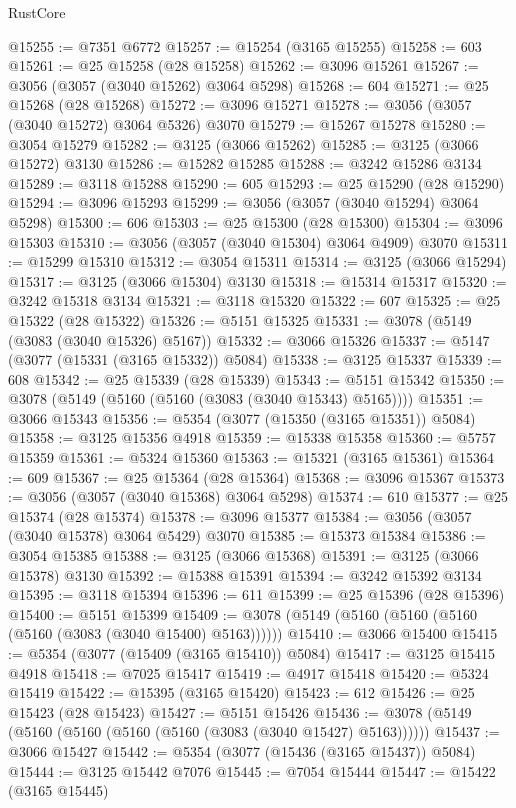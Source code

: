 \begin{lexlean}{RustCore}
\begin{coremodule}
@15255 := @7351 @6772
@15257 := @15254 (@3165 @15255)
@15258 := 603
@15261 := @25 @15258 (@28 @15258)
@15262 := @3096 @15261
@15267 := @3056 (@3057 (@3040 @15262) @3064 @5298)
@15268 := 604
@15271 := @25 @15268 (@28 @15268)
@15272 := @3096 @15271
@15278 := @3056 (@3057 (@3040 @15272) @3064 @5326) @3070
@15279 := @15267 @15278
@15280 := @3054 @15279
@15282 := @3125 (@3066 @15262)
@15285 := @3125 (@3066 @15272) @3130
@15286 := @15282 @15285
@15288 := @3242 @15286 @3134
@15289 := @3118 @15288
@15290 := 605
@15293 := @25 @15290 (@28 @15290)
@15294 := @3096 @15293
@15299 := @3056 (@3057 (@3040 @15294) @3064 @5298)
@15300 := 606
@15303 := @25 @15300 (@28 @15300)
@15304 := @3096 @15303
@15310 := @3056 (@3057 (@3040 @15304) @3064 @4909) @3070
@15311 := @15299 @15310
@15312 := @3054 @15311
@15314 := @3125 (@3066 @15294)
@15317 := @3125 (@3066 @15304) @3130
@15318 := @15314 @15317
@15320 := @3242 @15318 @3134
@15321 := @3118 @15320
@15322 := 607
@15325 := @25 @15322 (@28 @15322)
@15326 := @5151 @15325
@15331 := @3078 (@5149 (@3083 (@3040 @15326) @5167))
@15332 := @3066 @15326
@15337 := @5147 (@3077 (@15331 (@3165 @15332)) @5084)
@15338 := @3125 @15337
@15339 := 608
@15342 := @25 @15339 (@28 @15339)
@15343 := @5151 @15342
@15350 := @3078 (@5149 (@5160 (@5160 (@3083 (@3040 @15343) @5165))))
@15351 := @3066 @15343
@15356 := @5354 (@3077 (@15350 (@3165 @15351)) @5084)
@15358 := @3125 @15356 @4918
@15359 := @15338 @15358
@15360 := @5757 @15359
@15361 := @5324 @15360
@15363 := @15321 (@3165 @15361)
@15364 := 609
@15367 := @25 @15364 (@28 @15364)
@15368 := @3096 @15367
@15373 := @3056 (@3057 (@3040 @15368) @3064 @5298)
@15374 := 610
@15377 := @25 @15374 (@28 @15374)
@15378 := @3096 @15377
@15384 := @3056 (@3057 (@3040 @15378) @3064 @5429) @3070
@15385 := @15373 @15384
@15386 := @3054 @15385
@15388 := @3125 (@3066 @15368)
@15391 := @3125 (@3066 @15378) @3130
@15392 := @15388 @15391
@15394 := @3242 @15392 @3134
@15395 := @3118 @15394
@15396 := 611
@15399 := @25 @15396 (@28 @15396)
@15400 := @5151 @15399
@15409 := @3078 (@5149 (@5160 (@5160 (@5160 (@5160 (@3083 (@3040 @15400) @5163))))))
@15410 := @3066 @15400
@15415 := @5354 (@3077 (@15409 (@3165 @15410)) @5084)
@15417 := @3125 @15415 @4918
@15418 := @7025 @15417
@15419 := @4917 @15418
@15420 := @5324 @15419
@15422 := @15395 (@3165 @15420)
@15423 := 612
@15426 := @25 @15423 (@28 @15423)
@15427 := @5151 @15426
@15436 := @3078 (@5149 (@5160 (@5160 (@5160 (@5160 (@3083 (@3040 @15427) @5163))))))
@15437 := @3066 @15427
@15442 := @5354 (@3077 (@15436 (@3165 @15437)) @5084)
@15444 := @3125 @15442 @7076
@15445 := @7054 @15444
@15447 := @15422 (@3165 @15445)

\end{coremodule}
\end{lexlean}
